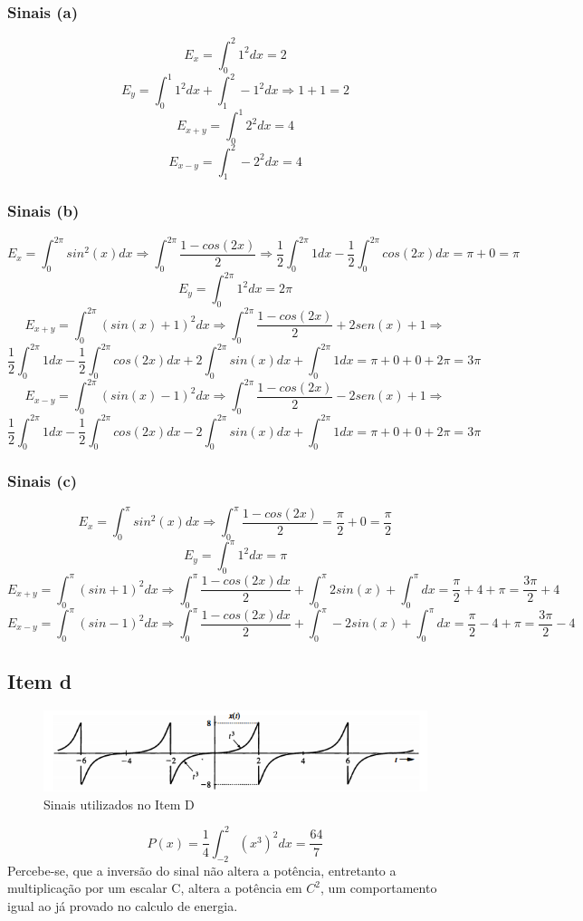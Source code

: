 \documentclass[a4paper, 12pt]{article}
\begin{document}
            \subsubsection{Sinais (a)}
            \[E_{x} = \int_{0}^{2} 1^{2}dx = 2 \]
            \[E_{y} = \int_{0}^{1} 1^{2}dx + \int_{1}^{2} -1^{2}dx \Rightarrow 1 + 1 = 2 \]
            \[E_{x+y} = \int_{0}^{1} 2^{2}dx = 4 \]
            \[E_{x-y} = \int_{1}^{2} -2^{2}dx = 4 \]
            \subsubsection{Sinais (b)}
            \[E_{x} = \int_{0}^{2\pi} sin^{2}(x)dx \Rightarrow \int_{0}^{2\pi} \frac{1-cos(2x)}{2} \Rightarrow  \frac{1}{2}\int_{0}^{2\pi} 1dx - \frac{1}{2}\int_{0}^{2\pi} cos(2x)dx = \pi + 0 = \pi\]
            \[E_{y} = \int_{0}^{2\pi} 1^{2}dx  = 2\pi \]
            \[E_{x+y} = \int_{0}^{2\pi} (sin(x) +1)^{2}dx \Rightarrow \int_{0}^{2\pi} \frac{1-cos(2x)}{2} + 2sen(x) + 1\Rightarrow\]\[ \frac{1}{2}\int_{0}^{2\pi} 1dx - \frac{1}{2}\int_{0}^{2\pi} cos(2x)dx + 2\int_{0}^{2\pi} sin(x)dx + \int_{0}^{2\pi} 1dx= \pi + 0 + 0 + 2\pi = 3\pi\]
            \[E_{x-y} = \int_{0}^{2\pi} (sin(x) -1)^{2}dx \Rightarrow \int_{0}^{2\pi} \frac{1-cos(2x)}{2} - 2sen(x) + 1\Rightarrow\]\[ \frac{1}{2}\int_{0}^{2\pi} 1dx - \frac{1}{2}\int_{0}^{2\pi} cos(2x)dx - 2\int_{0}^{2\pi} sin(x)dx + \int_{0}^{2\pi} 1dx= \pi + 0 + 0 + 2\pi = 3\pi\]
            \subsubsection{Sinais (c)}
            \[E_{x} = \int_{0}^{\pi} sin^{2}(x)dx \Rightarrow \int_{0}^{\pi} \frac{1-cos(2x)}{2} = \frac{\pi}{2} + 0 = \frac{\pi}{2} \]
            \[E_{y} = \int_{0}^{\pi} 1^{2}dx = \pi\]
            \[E_{x+y} = \int_{0}^{\pi} (sin + 1)^{2}dx \Rightarrow \int_{0}^{\pi} \frac{1-cos(2x)dx}{2} + \int_{0}^{\pi}2sin(x) + \int_{0}^{\pi}dx = \frac{\pi}{2} + 4 + \pi = \frac{3\pi}{2} + 4\]
            \[E_{x-y} = \int_{0}^{\pi} (sin - 1)^{2}dx \Rightarrow \int_{0}^{\pi} \frac{1-cos(2x)dx}{2} + \int_{0}^{\pi}-2sin(x) + \int_{0}^{\pi}dx = \frac{\pi}{2} - 4 + \pi = \frac{3\pi}{2} - 4\]
            \newpage
        \subsection{Item d}
            \begin{figure}[!ht]
                \centering
                \includegraphics{img/Figura4.PNG}
                \caption{Sinais utilizados no Item D}
            \end{figure}
            \[P(x) = \frac{1}{4} \int_{-2}^{2} (x^{3})^{2}dx = \frac{64}{7}\]
            Percebe-se, que a inversão do sinal não altera a potência, entretanto a multiplicação por um escalar C, altera a potência em $C^{2}$, um comportamento igual ao já provado no calculo de energia.
\end{document}
